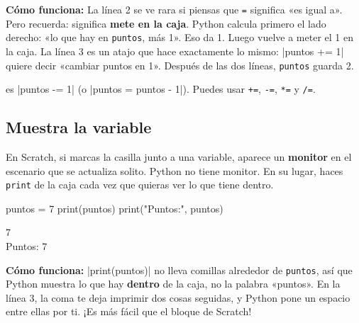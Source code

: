 \textbf{Cómo funciona:} La línea 2 se ve rara si piensas que \texttt{=} significa «es igual a». Pero recuerda: significa \textbf{mete en la caja}. Python calcula primero el lado derecho: «lo que hay en \texttt{puntos}, más 1». Eso da 1. Luego vuelve a meter el 1 en la caja. La línea 3 es un atajo que hace exactamente lo mismo: \py|puntos += 1| quiere decir «cambiar puntos en 1». Después de las dos líneas, \texttt{puntos} guarda 2.

\begin{think}
 es \py|puntos -= 1| (o \py|puntos = puntos - 1|). Puedes usar \texttt{+=}, \texttt{-=}, \texttt{*=} y \texttt{/=}.
\end{think}

\subsection*{Muestra la variable}

En Scratch, si marcas la casilla junto a una variable, aparece un \textbf{monitor} en el escenario que se actualiza solito. Python no tiene monitor. En su lugar, haces \texttt{print} de la caja cada vez que quieras ver lo que tiene dentro.

\begin{tcbraster}[raster columns=2, raster equal height=rows, raster column skip=12pt, raster valign=center]
\begin{tcolorbox}[colback=white, colframe=white, boxrule=0pt, valign=center]
\begin{scratch}
\end{scratch}
\end{tcolorbox}
\begin{code}
puntos = 7
print(puntos)
print("Puntos:", puntos)
\end{code}
\end{tcbraster}

\begin{outputbox}
7\\
Puntos: 7
\end{outputbox}

\textbf{Cómo funciona:} \py|print(puntos)| no lleva comillas alrededor de \texttt{puntos}, así que Python muestra lo que hay \textbf{dentro} de la caja, no la palabra «puntos». En la línea 3, la coma te deja imprimir dos cosas seguidas, y Python pone un espacio entre ellas por ti. ¡Es más fácil que el bloque  de Scratch!

